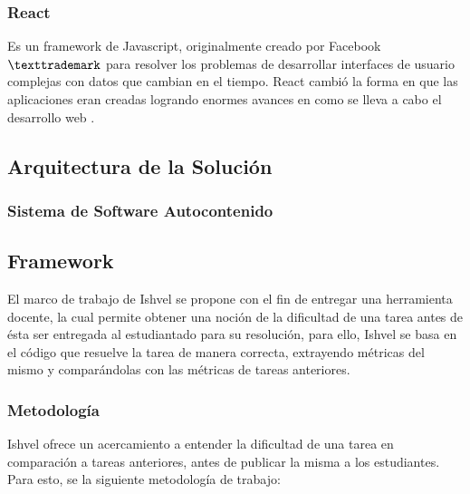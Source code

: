 \documentclass[letterpaper,12pt]{article}
\begin{document}
\subsubsection{React}

Es un framework de Javascript, originalmente creado por Facebook$\texttrademark$ para resolver los problemas de desarrollar interfaces de usuario complejas con datos que cambian en el tiempo. React cambió la forma en que las aplicaciones eran creadas logrando enormes avances en como se lleva a cabo el desarrollo web \cite{Gackenheimer2015}.

\subsection{Arquitectura de la Solución}

\subsubsection{Sistema de Software Autocontenido}

\subsection{Framework}

El marco de trabajo de Ishvel se propone con el fin de entregar una herramienta docente, la cual permite obtener una noción de la dificultad de una tarea antes de ésta ser entregada al estudiantado para su resolución, para ello, Ishvel se basa en el código que resuelve la tarea de manera correcta, extrayendo métricas del mismo y comparándolas con las métricas de tareas anteriores.

\subsubsection{Metodología}

Ishvel ofrece un acercamiento a entender la dificultad de una tarea en comparación a tareas anteriores, antes de publicar la misma a los estudiantes. Para esto, se la siguiente metodología de trabajo:
\end{document}

